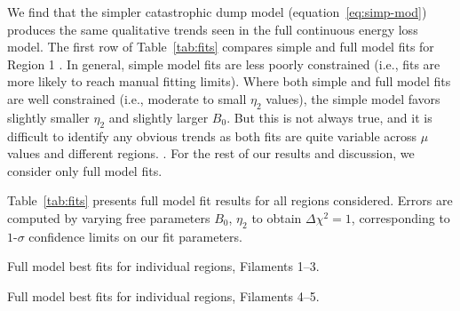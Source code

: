 \documentclass[iop, apj, numberedappendix, twocolappendix]{emulateapj}
\begin{document}
We find that the simpler catastrophic dump model (equation~\eqref{eq:simp-mod})
produces the same qualitative trends seen in the full continuous energy loss
model.  The first row of Table~\ref{tab:fits} compares simple and full model
fits for Region 1 .  In general, simple model
fits are less poorly constrained (i.e., fits are more likely to reach manual
fitting limits).  Where both simple and full model fits are well constrained
(i.e., moderate to small $\eta_2$ values), the simple model favors slightly
smaller $\eta_2$ and slightly larger $B_0$.  But this is not always true, and
it is difficult to identify any obvious trends as both fits are quite variable
across $\mu$ values and different regions.  .
For the rest of our results and discussion, we consider only full model fits.

Table~\ref{tab:fits} presents full model fit results for all regions
considered. Errors are computed by varying free parameters $B_0$,
$\eta_2$ to obtain $\Delta\chi^2 = 1$, corresponding to $1$-$\sigma$ confidence
limits on our fit parameters.

\begin{table*}[ht]
    \tiny
    \centering
    \caption{Full model best fits for individual regions, Filaments 1--3.
    \label{tab:fits}}
    
\end{table*}

\begin{table*}[ht]
    \tiny
    \centering
    \caption{Full model best fits for individual regions, Filaments 4--5.
    \label{tab:fits-pt2}}
    
\end{table*}
\end{document}
